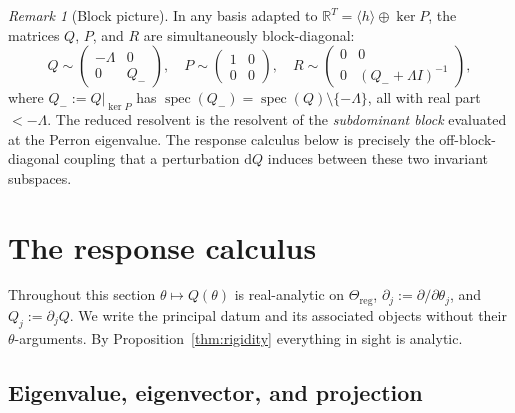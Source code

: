 \documentclass[11pt,reqno]{amsart}
\theoremstyle{plain}
\theoremstyle{definition}
\theoremstyle{remark}
\newtheorem{remark}[theorem]{Remark}
\newcommand{\R}{\mathbb{R}}
\newcommand{\Reg}{\Theta_{\mathrm{reg}}}
\newcommand{\dd}{\mathrm{d}}
\DeclareMathOperator{\spec}{spec}
\begin{document}
\begin{remark}[Block picture]\label{rem:block}
In any basis adapted to $\R^{T}=\langle h\rangle\oplus\ker P$, the matrices $Q$,
$P$, and $R$ are simultaneously block-diagonal:
\[
Q\sim\begin{pmatrix}-\Lambda & 0\\ 0 & Q_-\end{pmatrix},\quad
P\sim\begin{pmatrix}1&0\\0&0\end{pmatrix},\quad
R\sim\begin{pmatrix}0&0\\0&(Q_-+\Lambda I)^{-1}\end{pmatrix},
\]
where $Q_-:=Q|_{\ker P}$ has $\spec(Q_-)=\spec(Q)\setminus\{-\Lambda\}$, all with
real part $<-\Lambda$. The reduced resolvent is the resolvent of the
\emph{subdominant block} evaluated at the Perron eigenvalue. The response calculus
below is precisely the off-block-diagonal coupling that a perturbation $\dd Q$
induces between these two invariant subspaces.
\end{remark}


\section{The response calculus}\label{sec:perturbation}


Throughout this section $\theta\mapsto Q(\theta)$ is real-analytic on $\Reg$,
$\partial_j:=\partial/\partial\theta_j$, and $Q_j:=\partial_jQ$. We write the
principal datum and its associated objects without their $\theta$-arguments. By
Proposition~\ref{thm:rigidity} everything in sight is analytic.

\subsection{Eigenvalue, eigenvector, and projection}
\end{document}
